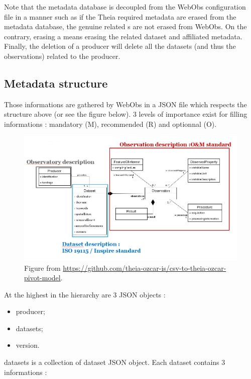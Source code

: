Note that the metadata database is decoupled from the WebObs configuration file in a manner such as if the Theia required metadata are erased from the metadata database, the genuine related s are not erased from WebObs. On the contrary, erasing a  means erasing the related dataset and affiliated metadata. Finally, the deletion of a producer will delete all the datasets (and thus the observations) related to the producer.

\subsection{Metadata structure}

Those informations are gathered by WebObs in a JSON file which respects the structure above (or see the figure below). 3 levels of importance exist for filling informations : mandatory (M), recommended (R) and optionnal (O).

\begin{figure}[!h]
	\centering
	\includegraphics[width=\textwidth]{figures/theia_pivot_model.png}
	\caption{Figure from \url{https://github.com/theia-ozcar-is/csv-to-theia-ozcar-pivot-model}.}
\end{figure}


At the highest in the hierarchy are 3 JSON objects : 

\begin{itemize}
\item 	 producer;
\item 	 datasets;
\item 	 version.
\end{itemize}

datasets is a collection of dataset JSON object. Each dataset contains 3 informations : 

